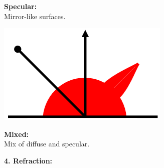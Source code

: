 \documentclass[a4paper, fontsize=8pt, landscape, DIV=1]{scrartcl}
\begin{document}
\begin{multicols*}{4}
\begin{minipage}[t]{0.49\columnwidth}
\begin{flushleft}
			\end{flushleft}
		\end{minipage}
		\begin{minipage}[b]{0.49\columnwidth}
			\begin{flushleft}
				\textbf{Specular:}\\
				Mirror-like surfaces.
				\vspace{0.5cm}
			\end{flushleft}
		\end{minipage}
		\par 
		\begin{minipage}[t]{0.49\columnwidth}
			\begin{flushleft}
				\includegraphics[width=\columnwidth]{images/Introduction/refl_mixed.png}\\
			\end{flushleft}
		\end{minipage}
		\begin{minipage}[b]{0.49\columnwidth}
			\begin{flushleft}
				\textbf{Mixed:}\\
				Mix of diffuse and specular.
				\vspace{0.5cm}
			\end{flushleft}
		\end{minipage}
		\par 
		\textbf{4. Refraction:}\\
		\begin{minipage}[t]{0.39\columnwidth}
			\begin{flushleft}

\end{flushleft}
\end{minipage}
\end{multicols*}
\end{document}
